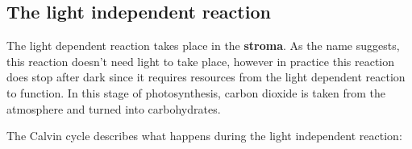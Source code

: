 \documentclass{article}
\begin{document}
\subsection*{The light independent reaction}
The light dependent reaction takes place in the \textbf{stroma}. As the name suggests, this reaction doesn't need light to take place, however in practice this reaction does stop after dark since it requires resources from the light dependent reaction to function. In this stage of photosynthesis, carbon dioxide is taken from the atmosphere and turned into carbohydrates.

The Calvin cycle describes what happens during the light independent reaction:
\end{document}
